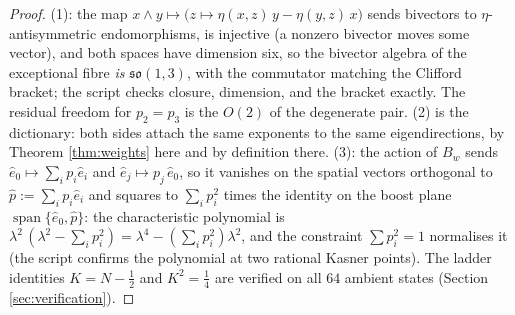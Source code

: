 \documentclass[11pt]{article}
\theoremstyle{definition}
\begin{document}
\begin{proof}
(1): the map $x \wedge y \mapsto \bigl(z \mapsto \eta(x,z)\,y - \eta(y,z)\,x\bigr)$ sends bivectors to $\eta$-antisymmetric endomorphisms, is injective (a nonzero bivector moves some vector), and both spaces have dimension six, so the bivector algebra of the exceptional fibre \emph{is} $\mathfrak{so}(1,3)$, with the commutator matching the Clifford bracket; the script checks closure, dimension, and the bracket exactly. The residual freedom for $p_2 = p_3$ is the $O(2)$ of the degenerate pair. (2) is the dictionary: both sides attach the same exponents to the same eigendirections, by Theorem \ref{thm:weights} here and by definition there. (3): the action of $B_w$ sends $\hat e_0 \mapsto \sum_i p_i \hat e_i$ and $\hat e_j \mapsto p_j\, \hat e_0$, so it vanishes on the spatial vectors orthogonal to $\hat p := \sum_i p_i \hat e_i$ and squares to $\sum_i p_i^2$ times the identity on the boost plane $\operatorname{span}\{\hat e_0, \hat p\}$: the characteristic polynomial is $\lambda^2\,(\lambda^2 - \sum_i p_i^2) = \lambda^4 - (\sum_i p_i^2)\lambda^2$, and the constraint $\sum p_i^2 = 1$ normalises it (the script confirms the polynomial at two rational Kasner points). The ladder identities $K = N - \tfrac12$ and $K^2 = \tfrac14$ are verified on all $64$ ambient states (Section \ref{sec:verification}).
\end{proof}
\end{document}
